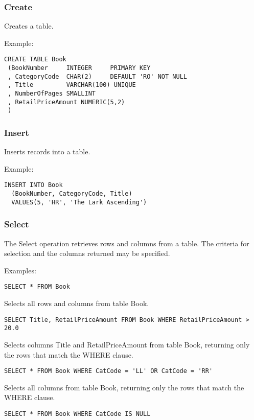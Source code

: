 

\subsubsection{Create}

Creates a table.

Example:

\begin{verbatim}
CREATE TABLE Book
 (BookNumber     INTEGER     PRIMARY KEY
 , CategoryCode  CHAR(2)     DEFAULT 'RO' NOT NULL
 , Title         VARCHAR(100) UNIQUE
 , NumberOfPages SMALLINT
 , RetailPriceAmount NUMERIC(5,2)
 )
\end{verbatim}

\subsubsection{Insert}

Inserts records into a table.

Example:

\begin{verbatim}
INSERT INTO Book
  (BookNumber, CategoryCode, Title)
  VALUES(5, 'HR', 'The Lark Ascending')
\end{verbatim}

\subsubsection{Select}

The Select operation retrieves rows and columns from a table. The criteria
for selection and the columns returned may be specified.

Examples:

\verb$SELECT * FROM Book$

Selects all rows and columns from table Book.

\verb$SELECT Title, RetailPriceAmount FROM Book WHERE RetailPriceAmount > 20.0$

Selects columns Title and RetailPriceAmount from table Book, returning only
the rows that match the WHERE clause.

\verb$SELECT * FROM Book WHERE CatCode = 'LL' OR CatCode = 'RR'$

Selects all columns from table Book, returning only
the rows that match the WHERE clause.

\verb$SELECT * FROM Book WHERE CatCode IS NULL$

